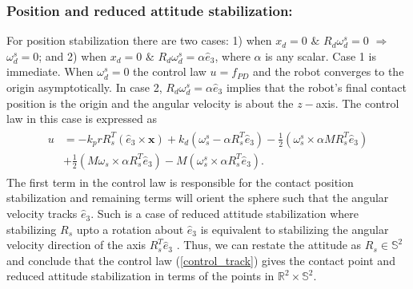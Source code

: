 \documentclass{ifacconf}
\begin{document}
\subsubsection*{Position and reduced attitude stabilization:} 
For position stabilization there are two cases: 1) when $x_{d}=0$ $\& $ $R_{d}\omega_{d}^{s} = 0$ $\Rightarrow$ $\omega_{d}^{s}=0$; and 2) when $x_{d}=0$ $\& $ $R_{d}\omega_{d}^{s} = \alpha \hat{e}_{3}$, where $\alpha$ is any scalar. Case 1 is immediate. When $\omega_{d}^{s}=0$ the control law $u = f_{PD}$ and the robot converges to the origin asymptotically. In case 2, $R_{d}\omega_{d}^{s} = \alpha \hat{e}_{3}$ implies that the robot's final contact position is the origin and the angular velocity is about the $z-$axis. The control law in this case is expressed as 
\begin{align}\nonumber
\begin{split}
u & = - k_{p}r R_{s}^{T}(\hat{e}_{3} \times \mathbf{x}) + k_{d} (\omega_{s}^{s} - \alpha R_{s}^{T}\hat{e}_{3}) - \frac{1}{2} (\omega_{s}^{s} \times \alpha M R_{s}^{T}\hat{e}_{3}) \\
& + \frac{1}{2} (M\omega_{s} \times \alpha R_{s}^{T}\hat{e}_{3}) - M (\omega_{s}^{s} \times \alpha R_{s}^{T}\hat{e}_{3}).
\end{split}
\end{align}
The first term in the control law is responsible for the contact position stabilization and remaining terms will orient the sphere such that the angular velocity tracks $\hat{e}_{3}$. Such is a case of reduced attitude stabilization where stabilizing $R_{s}$ upto a rotation about $\hat{e}_{3}$ is equivalent to stabilizing the angular velocity direction of the axis $R_{s}^{T}\hat{e}_{3}$ \citep{bullo_murray_track}. Thus, we can restate the attitude as $R_{s} \in \mathbb{S}^{2}$ and conclude that the control law (\ref{control_track}) gives the contact point and reduced attitude stabilization in terms of the points in $\mathbb{R}^{2} \times \mathbb{S}^{2}$. 
\end{document}
